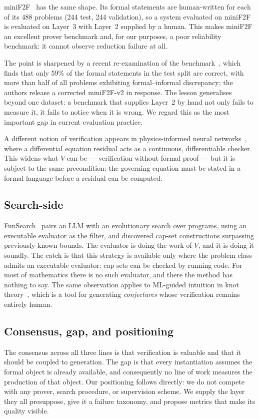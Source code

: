 \documentclass[11pt,a4paper]{article}
\begin{document}
miniF2F~\cite{zheng2022minif2f} has the same shape.  Its formal statements are
human-written for each of its 488 problems (244 test, 244 validation), so a
system evaluated on miniF2F is evaluated on Layer~3 with Layer~2 supplied by a
human.  This makes miniF2F an excellent prover benchmark and, for our purposes,
a poor reliability benchmark: it cannot observe reduction failure at all.

The point is sharpened by a recent re-examination of the
benchmark~\cite{ospanov2025minif2f}, which finds that only $59\%$ of the formal
statements in the test split are correct, with more than half of all problems
exhibiting formal--informal discrepancy; the authors release a corrected
miniF2F-v2 in response.  The lesson generalises beyond one dataset: a benchmark
that supplies Layer~2 by hand not only fails to measure it, it fails to notice
when it is wrong.  We regard this as the most important gap in current
evaluation practice.

A different notion of verification appears in physics-informed neural
networks~\cite{raissi2019pinn}, where a differential equation residual acts as a
continuous, differentiable checker.  This widens what $V$ can be --- verification
without formal proof --- but it is subject to the same precondition: the
governing equation must be stated in a formal language before a residual can be
computed.

\subsection{Search-side}
FunSearch~\cite{romera2024funsearch} pairs an LLM with an evolutionary search
over programs, using an executable evaluator as the filter, and discovered
cap-set constructions surpassing previously known bounds.  The evaluator is
doing the work of $V$, and it is doing it soundly.  The catch is that this
strategy is available only where the problem class admits an executable
evaluator: cap sets can be checked by running code.  For most of mathematics
there is no such evaluator, and there the method has nothing to say.  The
same observation applies to ML-guided intuition in knot
theory~\cite{davies2021advancing}, which is a tool for generating \emph{conjectures}
whose verification remains entirely human.

\subsection{Consensus, gap, and positioning}
The consensus across all three lines is that verification is valuable and that
it should be coupled to generation.  The gap is that every instantiation assumes
the formal object is already available, and consequently no line of work measures
the production of that object.  Our positioning follows directly: we do not
compete with any prover, search procedure, or supervision scheme.  We supply the
layer they all presuppose, give it a failure taxonomy, and propose metrics that
make its quality visible.
\end{document}
